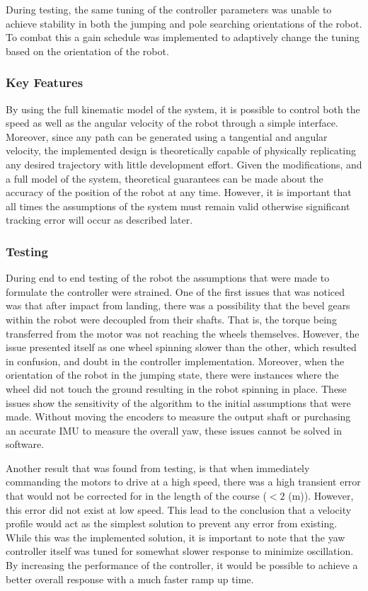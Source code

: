 \documentclass[ece]{uw-wkrpt}
\begin{document}
During testing, the same tuning of the controller parameters was unable to achieve stability in both the jumping and pole searching orientations of the robot. To combat this a gain schedule was implemented to adaptively change the tuning based on the orientation of the robot. 

\subsubsection{Key Features}

By using the full kinematic model of the system, it is possible to control both the speed as well as the angular velocity of the robot through a simple interface. Moreover, since any path can be generated using a tangential and angular velocity, the implemented design is theoretically capable of physically replicating any desired trajectory with little development effort. Given the modifications, and a full model of the system, theoretical guarantees can be made about the accuracy of the position of the robot at any time. However, it is important that all times the assumptions of the system must remain valid otherwise significant tracking error will occur as described later.

\subsubsection{Testing}

During end to end testing of the robot the assumptions that were made to formulate the controller were strained. One of the first issues that was noticed was that after impact from landing, there was a possibility that the bevel gears within the robot were decoupled from their shafts. That is, the torque being transferred from the motor was not reaching the wheels themselves. However, the issue presented itself as one wheel spinning slower than the other, which resulted in confusion, and doubt in the controller implementation. Moreover, when the orientation of the robot in the jumping state, there were instances where the wheel did not touch the ground resulting in the robot spinning in place. These issues show the sensitivity of the algorithm to the initial assumptions that were made. Without moving the encoders to measure the output shaft or purchasing an accurate IMU to measure the overall yaw, these issues cannot be solved in software. 

Another result that was found from testing, is that when immediately commanding the motors to drive at a high speed, there was a high transient error that would not be corrected for in the length of the course ($<2$ (m)). However, this error did not exist at low speed. This lead to the conclusion that a velocity profile would act as the simplest solution to prevent any error from existing. While this was the implemented solution, it is important to note that the yaw controller itself was tuned for somewhat slower response to minimize oscillation. By increasing the performance of the controller, it would be possible to achieve a better overall response with a much faster ramp up time. 
\end{document}
